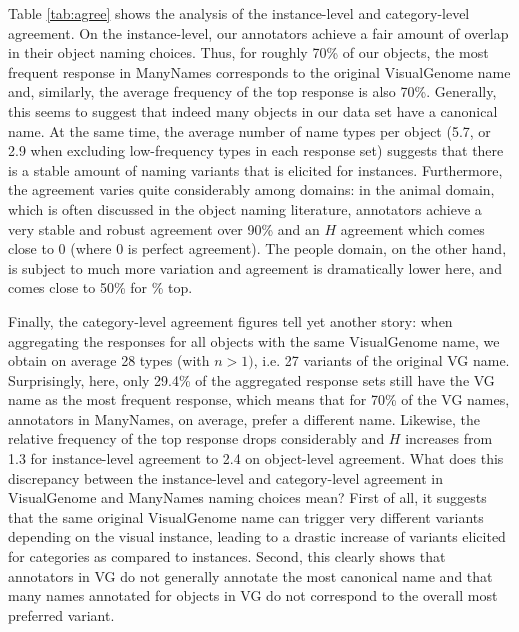 Table \ref{tab:agree} shows the analysis of the instance-level and category-level agreement.
On the instance-level, our annotators achieve a fair amount of overlap in their object naming choices. Thus, for roughly 70\% of our objects, the most frequent response in ManyNames corresponds to the original VisualGenome name and, similarly, the average frequency of the top response is also 70\%. Generally, this seems to suggest that indeed many objects in our data set have a canonical name. At the same time, the average number of name types per object (5.7, or 2.9 when excluding low-frequency types in each response set) suggests that there is a stable amount of naming variants that is elicited for instances. Furthermore, the agreement varies quite considerably among domains:  in the animal domain, which is often discussed in the object naming literature, annotators achieve a very stable and robust agreement over 90\% and an $H$ agreement which comes close to 0 (where 0 is perfect agreement). 
The people domain, on the other hand, is subject to much more variation and agreement is dramatically lower here, and comes close to 50\% for \% top.

Finally, the category-level agreement figures tell yet another story: when aggregating the responses for all objects with the same VisualGenome name, we obtain on average 28 types (with $n > 1)$, i.e. 27 variants of the original VG name. Surprisingly, here, only 29.4\% of the aggregated response sets still have the VG name as the most frequent response, which means that for 70\% of the VG names, annotators in ManyNames, on average, prefer a different name.  Likewise, the relative frequency of the top response drops considerably and $H$ increases from 1.3 for instance-level agreement to 2.4 on object-level agreement.  
What does this discrepancy between the instance-level and category-level agreement in VisualGenome and ManyNames naming choices mean? First of all, it suggests that the same original VisualGenome name can trigger very different variants depending on the visual instance, leading to a drastic increase of variants elicited for categories as compared to instances.
Second, this clearly shows that annotators in VG do not generally annotate the most canonical name and that many names annotated for objects in VG do not correspond to the overall most preferred variant. 

